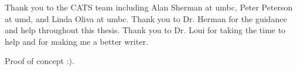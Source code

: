 Thank you to the CATS team including Alan Sherman at \gls{umbc}, Peter Peterson at \gls{umd}, and Linda Oliva at \gls{umbc}. Thank you to Dr. Herman for the guidance and help throughout this thesis. Thank you to Dr. Loui for taking the time to help and for making me a better writer.


Proof of concept :).
